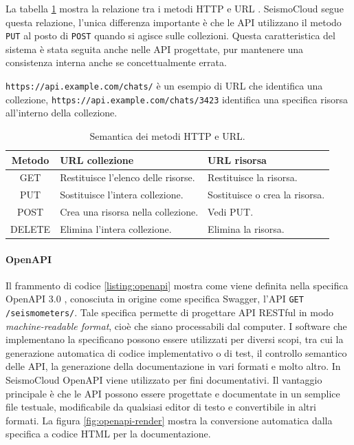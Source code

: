 La tabella \ref{tab:rest} mostra la relazione tra i metodi HTTP e URL \cite{http-methods}. SeismoCloud segue questa relazione, l'unica differenza importante è che le API utilizzano il metodo \texttt{PUT} al posto di \texttt{POST} quando si agisce sulle collezioni. Questa caratteristica del sistema è stata seguita anche nelle API progettate, pur mantenere una consistenza interna anche se concettualmente errata.

\texttt{https://api.example.com/chats/} è un esempio di URL che identifica una collezione, \texttt{https://api.example.com/chats/3423} identifica una specifica risorsa all'interno della collezione.

\begin{table}[h!]
\centering
\caption{Semantica dei metodi HTTP e URL.}
\label{tab:rest}

\begin{tabular}{c|p{14em}|p{14em}}
\textbf{Metodo} & \textbf{URL collezione} & \textbf{URL risorsa} \\
\hline
GET & Restituisce l'elenco delle risorse. & Restituisce la risorsa. \\
PUT & Sostituisce l'intera collezione. & Sostituisce o crea la risorsa. \\
POST & Crea una risorsa nella collezione. & Vedi PUT. \\
DELETE & Elimina l'intera collezione. & Elimina la risorsa. \\
\end{tabular}
\end{table}

\paragraph{OpenAPI} Il frammento di codice \ref{listing:openapi} mostra come viene definita nella specifica OpenAPI 3.0 \cite{openapi}, conosciuta in origine come specifica Swagger, l'API \texttt{GET /seismometers/}. Tale specifica permette di progettare API RESTful in modo \textit{machine-readable format}, cioè che siano processabili dal computer. I software che implementano la specificano possono essere utilizzati per diversi scopi, tra cui la generazione automatica di codice implementativo o di test, il controllo semantico delle API, la generazione della documentazione in vari formati e molto altro. In SeismoCloud OpenAPI viene utilizzato per fini documentativi. Il vantaggio principale è che le API possono essere progettate e documentate in un semplice file testuale, modificabile da qualsiasi editor di testo e convertibile in altri formati. La figura \ref{fig:openapi-render} mostra la conversione automatica dalla specifica a codice HTML per la documentazione.

